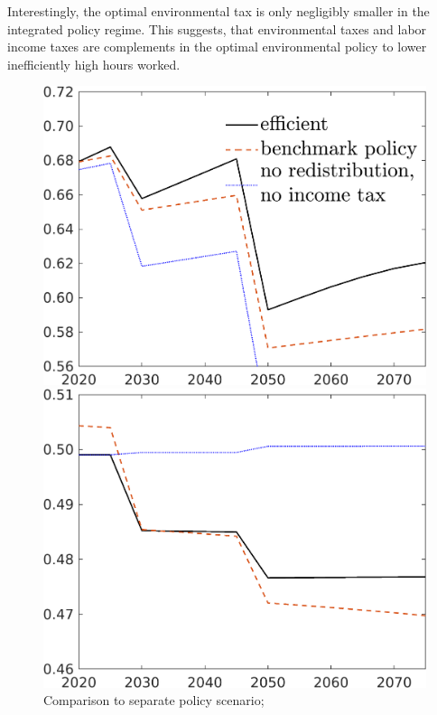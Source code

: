 Interestingly, the optimal environmental tax is only negligibly smaller in the integrated policy regime. This suggests, that environmental taxes and labor income taxes are complements in the optimal environmental policy to lower inefficiently high hours worked. 

\begin{figure}[h!!]
	\centering
	\caption{Comparison to separate policy scenario; }\label{fig:bench_nored_notaul}
	
	\begin{minipage}[]{0.32\textwidth}
		\includegraphics[width=1\textwidth]{../../codding_model/own_basedOnFried/optimalPol_190722_tidiedUp/figures/all_July22/C_CompEffOPT_T_NoTaus_pol2_spillover0_noskill0_sep1_xgrowth0_etaa0.79_lgd1_lff0.png}
	\end{minipage}
	\begin{minipage}[]{0.32\textwidth}
		\includegraphics[width=1\textwidth]{../../codding_model/own_basedOnFried/optimalPol_190722_tidiedUp/figures/all_July22/hh_CompEffOPT_T_NoTaus_pol2_spillover0_noskill0_sep1_xgrowth0_etaa0.79_lgd0_lff0.png}

\end{minipage}
\end{figure}
